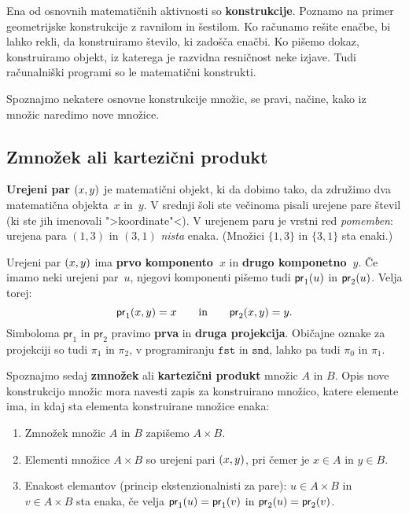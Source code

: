 Ena od osnovnih matematičnih aktivnosti so \textbf{konstrukcije}. Poznamo na primer geometrijske konstrukcije z ravnilom in šestilom. Ko računamo rešite enačbe, bi lahko rekli, da konstruiramo število, ki zadošča enačbi. Ko pišemo dokaz, konstruiramo objekt, iz katerega je razvidna resničnost neke izjave. Tudi računalniški programi so le matematični konstrukti.

Spoznajmo nekatere osnovne konstrukcije množic, se pravi, načine, kako iz množic naredimo nove množice.

\subsection{Zmnožek ali kartezični produkt}

\textbf{Urejeni par} $(x,y)$ je matematični objekt, ki da dobimo tako, da združimo dva matematična objekta~$x$ in~$y$. V srednji šoli ste večinoma pisali urejene pare števil (ki ste jih imenovali ">koordinate"<). V urejenem paru je vrstni red \emph{pomemben}: urejena para $(1, 3)$ in $(3, 1)$ \emph{nista} enaka. (Množici $\{1, 3\}$ in $\{3, 1\}$ sta enaki.)

Urejeni par $(x, y)$ ima \textbf{prvo komponento~$x$} in \textbf{drugo komponetno~$y$}. Če imamo neki urejeni par~$u$, njegovi komponenti pišemo tudi $\mathsf{pr}_1(u)$ in $\mathsf{pr}_2(u)$. Velja torej:
%
\begin{equation*}
    \mathsf{pr}_1(x,y) = x
    \qquad\text{in}\qquad
    \mathsf{pr}_2(x,y) = y.  
\end{equation*}
%
Simboloma $\mathsf{pr}_1$ in $\mathsf{pr}_2$ pravimo \textbf{prva} in \textbf{druga projekcija}. Običajne oznake za projekciji so tudi $\pi_1$ in $\pi_2$, v
programiranju $\mathtt{fst}$ in $\mathtt{snd}$, lahko pa tudi $\pi_0$ in $\pi_1$.

Spoznajmo sedaj \textbf{zmnožek} ali \textbf{kartezični produkt} množic $A$ in $B$. Opis nove konstrukcijo množic mora navesti zapis za konstruirano množico, katere elemente ima, in kdaj sta elementa konstruirane množice enaka:
%
\begin{enumerate}
\item Zmnožek množic $A$ in $B$ zapišemo $A \times B$.
\item Elementi množice $A \times B$ so urejeni pari $(x, y)$, pri čemer je $x \in A$ in $y \in B$.
\item Enakost elemantov (princip ekstenzionalnisti za pare): $u \in A \times B$ in $v \in A \times B$ sta enaka, če velja $\mathsf{pr}_1(u) = \mathsf{pr}_1(v)$ in $\mathsf{pr}_2(u) = \mathsf{pr}_2(v)$.
\end{enumerate}

